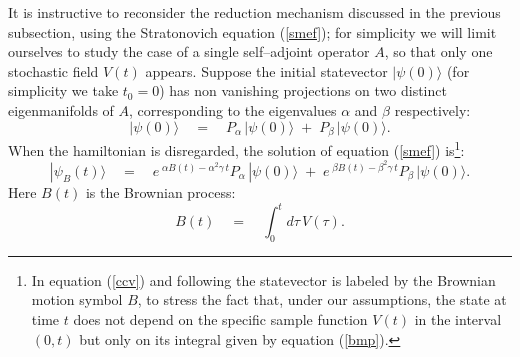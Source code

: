 \documentclass[10pt,a4paper]{article}
\begin{document}
It is instructive to reconsider the reduction mechanism discussed
in the previous subsection, using the Stratonovich equation
(\ref{smef}); for simplicity we will limit ourselves to study the
case of a single self--adjoint operator $A$, so that only one
stochastic field $V(t)$ appears. Suppose the initial
statevector $|\psi(0)\rangle$ (for simplicity we take $t_{0} = 0$)
has non vanishing projections on two distinct eigenmanifolds of
$A$, corresponding to the eigenvalues $\alpha$ and $\beta$
respectively:
\begin{equation} \label{ispe}
|\psi(0)\rangle \quad = \quad P_{\alpha}\,|\psi(0)\rangle \; + \;
P_{\beta}\,|\psi(0)\rangle.
\end{equation}
When the hamiltonian is disregarded, the solution of equation
(\ref{smef}) is\footnote{In equation (\ref{ccv}) and following the
statevector is labeled by the Brownian motion symbol $B$, to
stress the fact that, under our assumptions, the state at time $t$
does not depend on the specific sample function $V(t)$ in the
interval $(0,t)$ but only on its integral given by equation
(\ref{bmp}).}:
\begin{equation} \label{ccv}
|\psi_{B}(t)\rangle \quad = \quad e^{\displaystyle \;\alpha B(t) -
\alpha^{2}\gamma\, t} P_{\alpha}\,|\psi(0)\rangle \; + \;
e^{\displaystyle \;\beta B(t) - \beta^{2}\gamma\, t}
P_{\beta}\,|\psi(0)\rangle.
\end{equation}
Here $B(t)$ is the Brownian process:
\begin{equation} \label{bmp}
B(t) \quad = \quad \int_{0}^{t} d\tau\, V(\tau).
\end{equation}
\end{document}
